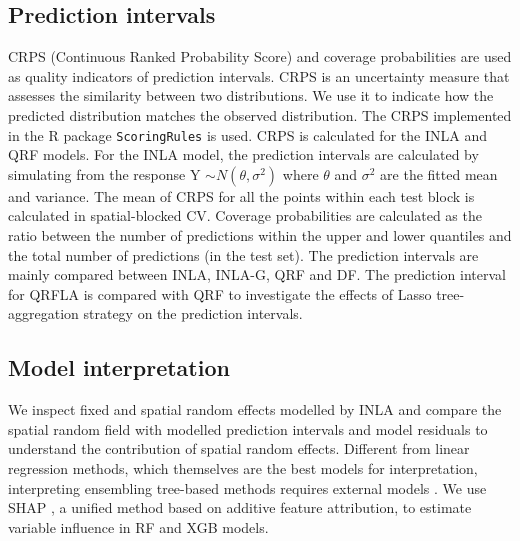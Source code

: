 \documentclass{article}
\begin{document}
\subsection {Prediction intervals}
CRPS (Continuous Ranked Probability Score) and coverage probabilities are used as quality indicators of prediction intervals. CRPS is an uncertainty measure that assesses the similarity between two distributions.  We use it to indicate how the predicted distribution matches the observed distribution. The CRPS implemented in the R package {\tt ScoringRules} \citep{jordan2017evaluating} is used. CRPS is calculated for the INLA and QRF models. For the INLA model, the prediction intervals are calculated by simulating from the response Y $\sim N(\theta, \sigma^2)$ where $\theta$ and $\sigma^2$ are the fitted mean and variance. The mean of CRPS for all the points within each test block is calculated in spatial-blocked CV. Coverage probabilities are calculated as the ratio between the number of predictions within the upper and lower quantiles and the total number of predictions (in the test set). The prediction intervals are mainly compared between INLA, INLA-G, QRF and DF. The prediction interval for QRFLA is compared with QRF to investigate the effects of Lasso tree-aggregation strategy on the prediction intervals.
 
\subsection{Model interpretation}
We inspect fixed and spatial random effects modelled by INLA and compare the spatial random field with modelled prediction intervals and model residuals to understand the contribution of spatial random effects. Different from linear regression methods, which themselves are the best models for interpretation, interpreting ensembling tree-based methods requires external models \citep{NIPS2017_8a20a862}. We use SHAP \citep[SHapley Additive exPlanations,][]{lundberg2018explainable}, a unified method based on additive feature attribution, to estimate variable influence in RF and XGB models.   


\end{document}
